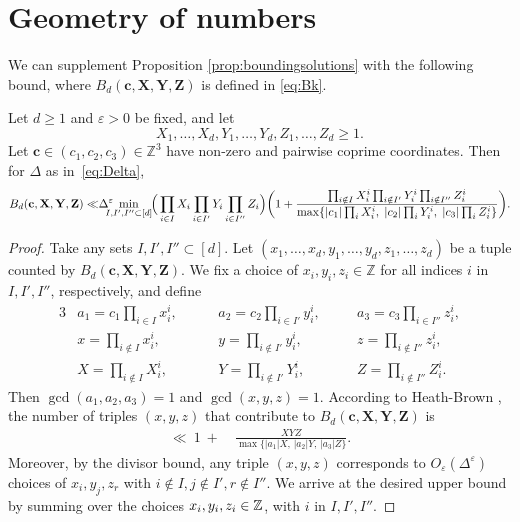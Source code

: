 \section{Geometry of numbers}\label{s:geom}


We can supplement Proposition \ref{prop:boundingsolutions} with the following bound,
where  $B_d(\mathbf{c},\mathbf{X},\mathbf{Y},\mathbf{Z})$ is  defined in  \eqref{eq:Bk}.

\begin{proposition} \label{prop:detmethod}
Let $d\geq 1$ and $\varepsilon>0$ be fixed, and let
$$
X_1,\ldots, X_d, Y_1,\ldots, Y_d,Z_1,\ldots, Z_d\geq 1.
$$
Let $\mathbf{c}\in (c_1,c_2,c_3)\in \mathbb{Z}^3$ have non-zero and pairwise coprime coordinates.
Then for $\Delta$ as in~\eqref{eq:Delta},
$$
B_d(\mathbf{c},\mathbf{X},\mathbf{Y},\mathbf{Z})
\ll
\hspace{-0.1cm} \Delta^{\varepsilon}
\hspace{-0.3cm}
\min_{I,I',I''\subset[d]}
\hspace{-0.1cm}
\Big(\prod_{i\in I}X_i\prod_{i\in I'}Y_i\prod_{i\in I''}Z_i\Big)\bigg(1 +
\frac{\prod_{i\notin I}X_i^i\prod_{i\notin I'}Y_i^i\prod_{i\notin I''}Z_i^i}
{\max\{|c_1|\prod_{i}X_i^i,\;|c_2|\prod_{i}Y_i^i,\;|c_3|\prod_{i}Z_i^i\}}\bigg).
$$
\end{proposition}
\begin{proof}
Take any sets $I,I',I''\subset[d]$. Let $(x_1,\ldots, x_d,y_1,\ldots, y_d,z_1,\ldots, z_d)$ be a tuple counted by $B_d(\mathbf{c},\mathbf{X},\mathbf{Y},\mathbf{Z})$. We fix a choice of
$
x_i,y_i,z_i \in \mathbb{Z}
$ for all indices $i$ in $I,I',I''$, respectively, and define
\begin{alignat*}{3}
&a_1=c_1\prod_{i\in I}x_i^i, \quad
&&a_2=c_2\prod_{i\in I'}y_i^i, \quad
&&a_3=c_3\prod_{i\in I''}z_i^i,\\
&x=\prod_{i\notin I}x_i^i, \qquad
&&y=\prod_{i\notin I'}y_i^i, \qquad
&&z=\prod_{i\notin I''}z_i^i,\\
&X=\prod_{i\notin I}X_i^i, \qquad
&&Y=\prod_{i\notin I'}Y_i^i, \qquad
&&Z=\prod_{i\notin I''}Z_i^i.
\end{alignat*}
Then $\gcd(a_1,a_2,a_3)=1$ and $\gcd(x,y,z)=1$. According to Heath-Brown \cite[Lemma 3]{h-b84}, the number of triples $(x,y,z)$ that contribute to $B_d(\mathbf{c},\mathbf{X},\mathbf{Y},\mathbf{Z})$ is
\begin{align*}
\ll \ 1 \ + \ &
\frac{XYZ}{\max\big\{|a_1|X,\,|a_2|Y,\,|a_3|Z\big\}}.
\end{align*}
Moreover, by the divisor bound, any triple $(x,y,z)$ corresponds to $O_{\varepsilon}(\Delta^{\varepsilon})$ choices of $x_i,y_j,z_r$ with $i\not \in I, j\not \in I', r\not \in I''$.
We arrive at the
desired upper bound by
summing over the choices $x_i,y_i,z_i\in\mathbb{Z}$,  with $i$ in $I,I',I''$.
\end{proof}



